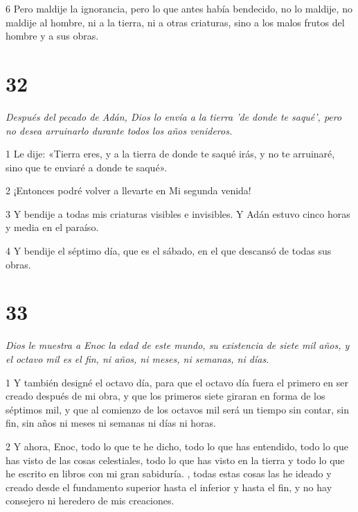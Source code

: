 \par 6 Pero maldije la ignorancia, pero lo que antes había bendecido, no lo maldije, no maldije al hombre, ni a la tierra, ni a otras criaturas, sino a los malos frutos del hombre y a sus obras.

\chapter{32}

\par \textit{Después del pecado de Adán, Dios lo envía a la tierra 'de donde te saqué', pero no desea arruinarlo durante todos los años venideros.}

\par 1 Le dije: «Tierra eres, y a la tierra de donde te saqué irás, y no te arruinaré, sino que te enviaré a donde te saqué».

\par 2 ¡Entonces podré volver a llevarte en Mi segunda venida!

\par 3 Y bendije a todas mis criaturas visibles e invisibles. Y Adán estuvo cinco horas y media en el paraíso.

\par 4 Y bendije el séptimo día, que es el sábado, en el que descansó de todas sus obras.

\chapter{33}

\par \textit{Dios le muestra a Enoc la edad de este mundo, su existencia de siete mil años, y el octavo mil es el fin, ni años, ni meses, ni semanas, ni días.}

\par 1 Y también designé el octavo día, para que el octavo día fuera el primero en ser creado después de mi obra, y que los primeros siete giraran en forma de los séptimos mil, y que al comienzo de los octavos mil será un tiempo sin contar, sin fin, sin años ni meses ni semanas ni días ni horas.

\par 2 Y ahora, Enoc, todo lo que te he dicho, todo lo que has entendido, todo lo que has visto de las cosas celestiales, todo lo que has visto en la tierra y todo lo que he escrito en libros con mi gran sabiduría. , todas estas cosas las he ideado y creado desde el fundamento superior hasta el inferior y hasta el fin, y no hay consejero ni heredero de mis creaciones.

